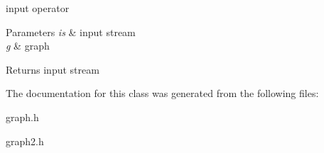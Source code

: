 input operator 


\begin{DoxyParams}{Parameters}
{\em is} & input stream \\
\hline
{\em g} & graph \\
\hline
\end{DoxyParams}
\begin{DoxyReturn}{Returns}
input stream 
\end{DoxyReturn}


The documentation for this class was generated from the following files\+:\begin{DoxyCompactItemize}
\item 
graph.\+h\item 
graph2.\+h\end{DoxyCompactItemize}
